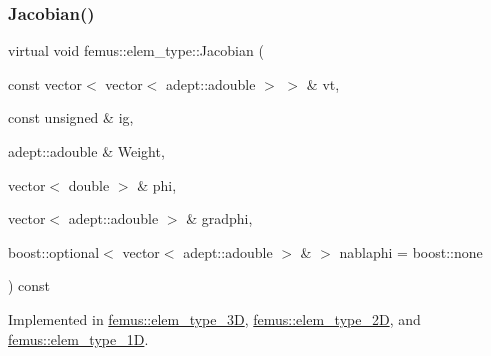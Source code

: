 \mbox{\label{classfemus_1_1elem__type_a937b1d5ecbeed3b17db831264a3492fa}} 
\subsubsection{\texorpdfstring{Jacobian()}{Jacobian()}\hspace{0.1cm}{\footnotesize\ttfamily [1/4]}}
{\footnotesize\ttfamily virtual void femus\+::elem\+\_\+type\+::\+Jacobian (\begin{DoxyParamCaption}\item[{const vector$<$ vector$<$ adept\+::adouble $>$ $>$ \&}]{vt,  }\item[{const unsigned \&}]{ig,  }\item[{adept\+::adouble \&}]{Weight,  }\item[{vector$<$ double $>$ \&}]{phi,  }\item[{vector$<$ adept\+::adouble $>$ \&}]{gradphi,  }\item[{boost\+::optional$<$ vector$<$ adept\+::adouble $>$ \& $>$}]{nablaphi = {\ttfamily boost\+:\+:none} }\end{DoxyParamCaption}) const\hspace{0.3cm}{\ttfamily [pure virtual]}}



Implemented in \mbox{\hyperlink{classfemus_1_1elem__type__3_d_a6ba1c6d58757d317c455e9041bdb1970}{femus\+::elem\+\_\+type\+\_\+3D}}, \mbox{\hyperlink{classfemus_1_1elem__type__2_d_af8ad48cebf3ed72aa7d718129bbc381f}{femus\+::elem\+\_\+type\+\_\+2D}}, and \mbox{\hyperlink{classfemus_1_1elem__type__1_d_a4c063f6c2d18fbc305e3bde505c49279}{femus\+::elem\+\_\+type\+\_\+1D}}.

\mbox{\label{classfemus_1_1elem__type_ac3828ecd8ddd057d726a60cb19c60f0b}} 
